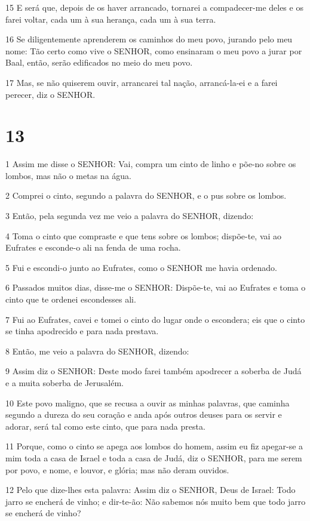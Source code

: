 \par 15 E será que, depois de os haver arrancado, tornarei a compadecer-me deles e os farei voltar, cada um à sua herança, cada um à sua terra.
\par 16 Se diligentemente aprenderem os caminhos do meu povo, jurando pelo meu nome: Tão certo como vive o SENHOR, como ensinaram o meu povo a jurar por Baal, então, serão edificados no meio do meu povo.
\par 17 Mas, se não quiserem ouvir, arrancarei tal nação, arrancá-la-ei e a farei perecer, diz o SENHOR.

\chapter{13}

\par 1 Assim me disse o SENHOR: Vai, compra um cinto de linho e põe-no sobre os lombos, mas não o metas na água.
\par 2 Comprei o cinto, segundo a palavra do SENHOR, e o pus sobre os lombos.
\par 3 Então, pela segunda vez me veio a palavra do SENHOR, dizendo:
\par 4 Toma o cinto que compraste e que tens sobre os lombos; dispõe-te, vai ao Eufrates e esconde-o ali na fenda de uma rocha.
\par 5 Fui e escondi-o junto ao Eufrates, como o SENHOR me havia ordenado.
\par 6 Passados muitos dias, disse-me o SENHOR: Dispõe-te, vai ao Eufrates e toma o cinto que te ordenei escondesses ali.
\par 7 Fui ao Eufrates, cavei e tomei o cinto do lugar onde o escondera; eis que o cinto se tinha apodrecido e para nada prestava.
\par 8 Então, me veio a palavra do SENHOR, dizendo:
\par 9 Assim diz o SENHOR: Deste modo farei também apodrecer a soberba de Judá e a muita soberba de Jerusalém.
\par 10 Este povo maligno, que se recusa a ouvir as minhas palavras, que caminha segundo a dureza do seu coração e anda após outros deuses para os servir e adorar, será tal como este cinto, que para nada presta.
\par 11 Porque, como o cinto se apega aos lombos do homem, assim eu fiz apegar-se a mim toda a casa de Israel e toda a casa de Judá, diz o SENHOR, para me serem por povo, e nome, e louvor, e glória; mas não deram ouvidos.
\par 12 Pelo que dize-lhes esta palavra: Assim diz o SENHOR, Deus de Israel: Todo jarro se encherá de vinho; e dir-te-ão: Não sabemos nós muito bem que todo jarro se encherá de vinho?
